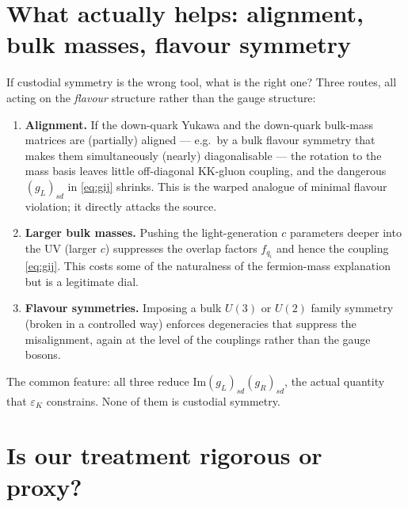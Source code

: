 \documentclass[11pt]{article}
\newcommand{\epsK}{\varepsilon_K}
\theoremstyle{definition}
\begin{document}
\section{What actually helps: alignment, bulk masses, flavour symmetry}
\label{sec:whathelps}

If custodial symmetry is the wrong tool, what is the right one? Three routes, all
acting on the \emph{flavour} structure rather than the gauge structure:
\begin{enumerate}[leftmargin=1.6em]
\item \textbf{Alignment.} If the down-quark Yukawa and the down-quark bulk-mass
matrices are (partially) aligned --- e.g.\ by a bulk flavour symmetry that makes
them simultaneously (nearly) diagonalisable --- the rotation to the mass basis
leaves little off-diagonal KK-gluon coupling, and the dangerous $(g_L)_{sd}$ in
\eqref{eq:gij} shrinks. This is the warped analogue of minimal flavour violation;
it directly attacks the source.
\item \textbf{Larger bulk masses.} Pushing the light-generation $c$ parameters
deeper into the UV (larger $c$) suppresses the overlap factors $f_{q_i}$ and hence
the coupling \eqref{eq:gij}. This costs some of the naturalness of the fermion-mass
explanation but is a legitimate dial.
\item \textbf{Flavour symmetries.} Imposing a bulk $U(3)$ or $U(2)$ family
symmetry (broken in a controlled way) enforces degeneracies that suppress the
misalignment, again at the level of the couplings rather than the gauge bosons.
\end{enumerate}
The common feature: all three reduce $\mathrm{Im}(g_L)_{sd}(g_R)_{sd}$, the actual
quantity that $\epsK$ constrains. None of them is custodial symmetry.

\section{Is our treatment rigorous or proxy?}
\label{sec:rigorvsproxy}
\end{document}

